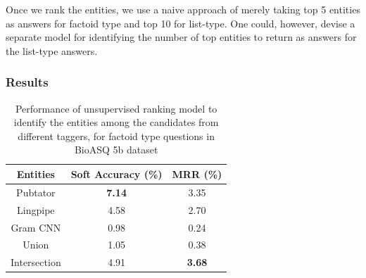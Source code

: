 \documentclass[11pt,a4paper]{article}
\begin{document}
Once we rank the entities, we use a naive approach of merely taking top 5 entities as answers for factoid type and top 10 for list-type. One could, however, devise a separate model for identifying the number of top entities to return as answers for the list-type answers.



\subsubsection{Results}


\begin{table}[t!]
    \centering
    \begin{tabular}{ccc} \hline
    Entities & Soft Accuracy (\%) & MRR (\%) \\ \hline
    Pubtator & \textbf{7.14} & 3.35 \\
    Lingpipe & 4.58 & 2.70 \\
    Gram CNN & 0.98 & 0.24 \\
    Union    & 1.05 & 0.38 \\
    Intersection & 4.91 & \textbf{3.68} \\ \hline
    \end{tabular}
    \caption{Performance of unsupervised ranking model to identify the entities among the candidates from different taggers, for factoid type questions in BioASQ 5b dataset}
    \label{tab:my_label}
\end{table}
\end{document}
